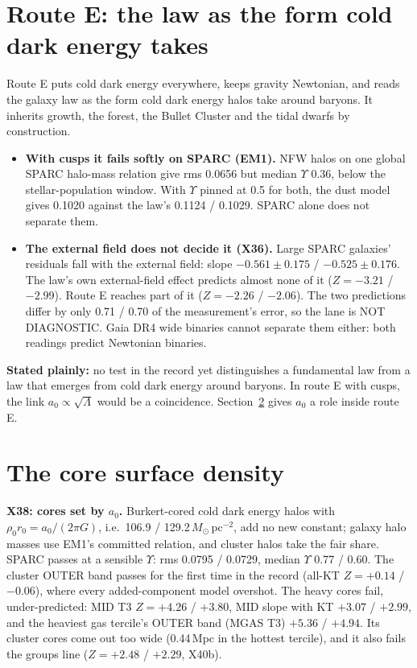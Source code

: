 \documentclass[10pt]{article}
\begin{document}
\section{Route E: the law as the form cold dark energy takes}
Route E puts cold dark energy everywhere, keeps gravity Newtonian, and reads the galaxy law as the form cold dark energy halos take around baryons. It inherits growth, the forest, the Bullet Cluster and the tidal dwarfs by construction.
\begin{itemize}
\item \textbf{With cusps it fails softly on SPARC (EM1).} NFW halos on one global SPARC halo-mass relation give rms 0.0656 but median $\Upsilon$ 0.36, below the stellar-population window. With $\Upsilon$ pinned at 0.5 for both, the dust model gives 0.1020 against the law's 0.1124 / 0.1029. SPARC alone does not separate them.
\item \textbf{The external field does not decide it (X36).} Large SPARC galaxies' residuals fall with the external field: slope $-0.561\pm0.175$ / $-0.525\pm0.176$. The law's own external-field effect predicts almost none of it ($Z=-3.21$ / $-2.99$). Route E reaches part of it ($Z=-2.26$ / $-2.06$). The two predictions differ by only 0.71 / 0.70 of the measurement's error, so the lane is NOT DIAGNOSTIC. Gaia DR4 wide binaries cannot separate them either: both readings predict Newtonian binaries.
\end{itemize}
\textbf{Stated plainly:} no test in the record yet distinguishes a fundamental law from a law that emerges from cold dark energy around baryons. In route E with cusps, the link $a_0\propto\sqrt\Lambda$ would be a coincidence. Section~\ref{sec:core} gives $a_0$ a role inside route E.

\section{The core surface density}\label{sec:core}
\textbf{X38: cores set by $a_0$.} Burkert-cored cold dark energy halos with $\rho_0r_0=a_0/(2\pi G)$, i.e.\ 106.9 / 129.2\,$M_\odot$\,pc$^{-2}$, add no new constant; galaxy halo masses use EM1's committed relation, and cluster halos take the fair share. SPARC passes at a sensible $\Upsilon$: rms 0.0795 / 0.0729, median $\Upsilon$ 0.77 / 0.60. The cluster OUTER band passes for the first time in the record (all-KT $Z=+0.14$ / $-0.06$), where every added-component model overshot. The heavy cores fail, under-predicted: MID T3 $Z=+4.26$ / $+3.80$, MID slope with KT $+3.07$ / $+2.99$, and the heaviest gas tercile's OUTER band (MGAS T3) $+5.36$ / $+4.94$. Its cluster cores come out too wide (0.44\,Mpc in the hottest tercile), and it also fails the groups line ($Z=+2.48$ / $+2.29$, X40b).
\end{document}

